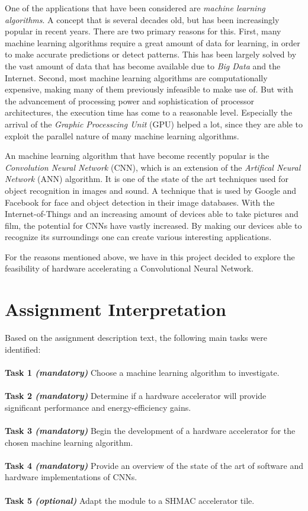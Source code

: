 One of the applications that have been considered are \textit{machine learning algorithms}. A concept that is several decades old, but has been increasingly popular in recent years. There are two primary reasons for this. First, many machine learning algorithms require a great amount of data for learning, in order to make accurate predictions or detect patterns. This has been largely solved by the vast amount of data that has become available due to \textit{Big Data} and the Internet. Second, most machine learning algorithms are computationally expensive, making many of them previously infeasible to make use of. But with the advancement of processing power and sophistication of processor architectures, the execution time has come to a reasonable level. Especially the arrival of the \textit{Graphic Processcing Unit} (GPU) helped a lot, since they are able to exploit the parallel nature of many machine learning algorithms. 

An machine learning algorithm that have become recently popular is the \textit{Convolution Neural Network} (CNN), which is an extension of the \textit{Artifical Neural Network} (ANN) algorithm. It is one of the state of the art techniques used for object recognition in images and sound. A technique that is used by Google and Facebook for face and object detection in their image databases. With the Internet-of-Things and an increasing amount of devices able to take pictures and film, the potential for CNNs have vastly increased. By making our devices able to recognize its surroundings one can create various interesting applications.

For the reasons mentioned above, we have in this project decided to explore the feasibility of hardware accelerating a Convolutional Neural Network. 

\section{Assignment Interpretation}

Based on the assignment description text, the following main tasks were
identified:\\ \hfil \\ \hfil
\textbf{Task 1 \textit{(mandatory)}} Choose a machine learning algorithm to investigate.  \\ \hfil \\ \hfil
\textbf{Task 2 \textit{(mandatory)}} Determine if a hardware accelerator will provide significant performance and energy-efficiency gains.  \\ \hfil \\ \hfil
\textbf{Task 3 \textit{(mandatory)}} Begin the development of a hardware accelerator for the chosen machine learning algorithm. \\ \hfil \\ \hfil
\textbf{Task 4 \textit{(mandatory)}} Provide an overview of the state of the art of software and hardware implementations of CNNs. \\ \hfil \\ \hfil
\textbf{Task 5 \textit{(optional)}} Adapt the module to a SHMAC accelerator tile. \\ \hfil \\ \hfil

